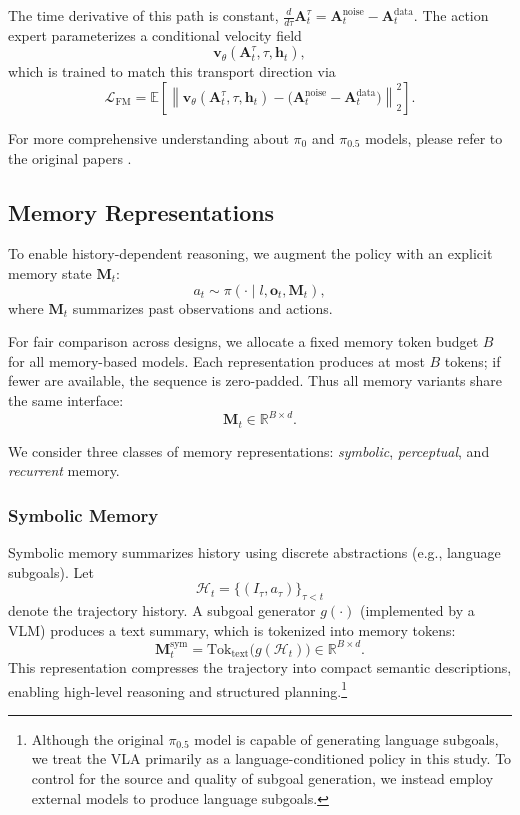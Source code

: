 The time derivative of this path is constant,
$\frac{d}{d\tau}\mathbf{A}_t^\tau=\mathbf{A}_t^{\text{noise}}-\mathbf{A}_t^{\text{data}}$.
The action expert parameterizes a conditional velocity field
\begin{equation}
\mathbf{v}_\theta(\mathbf{A}_t^\tau, \tau, \mathbf{h}_t),
\end{equation}
which is trained to match this transport direction via
\begin{equation}
\mathcal{L}_{\mathrm{FM}}
=
\mathbb{E}
\left[
\left\|
\mathbf{v}_\theta(\mathbf{A}_t^\tau, \tau, \mathbf{h}_t)
-
\big(
\mathbf{A}_t^{\text{noise}}
-
\mathbf{A}_t^{\text{data}}
\big)
\right\|_2^2
\right].
\end{equation}

For more comprehensive understanding about $\pi_{0}$ and $\pi_{0.5}$ models, please refer to the original papers \cite{pi05, pi0}.

\subsection{Memory Representations}
\label{sec:memory_repr}

To enable history-dependent reasoning, we augment the policy with an explicit memory state $\mathbf{M}_t$:
\[
a_t \sim \pi(\cdot \mid l, \mathbf{o}_t, \mathbf{M}_t),
\]
where $\mathbf{M}_t$ summarizes past observations and actions.

For fair comparison across designs, we allocate a fixed memory token budget $B$ for all memory-based models. Each representation produces at most $B$ tokens; if fewer are available, the sequence is zero-padded. Thus all memory variants share the same interface:
\[
\mathbf{M}_t \in \mathbb{R}^{B \times d}.
\]

We consider three classes of memory representations: \textit{symbolic}, \textit{perceptual}, and \textit{recurrent} memory.

\subsubsection{Symbolic Memory}

Symbolic memory summarizes history using discrete abstractions (e.g., language subgoals). Let
\[
\mathcal{H}_t=\{(I_\tau,a_\tau)\}_{\tau<t}
\]
denote the trajectory history. A subgoal generator $g(\cdot)$ (implemented by a VLM) produces a text summary, which is tokenized into memory tokens:
\[
\mathbf{M}_t^{\text{sym}}
=
\mathrm{Tok}_{\text{text}}\!\big(g(\mathcal{H}_t)\big)
\in \mathbb{R}^{B \times d}.
\]
This representation compresses the trajectory into compact semantic descriptions, enabling high-level reasoning and structured planning.\footnote{Although the original $\pi_{0.5}$ model is capable of generating language subgoals, we treat the VLA primarily as a language-conditioned policy in this study. To control for the source and quality of subgoal generation, we instead employ external models to produce language subgoals.}

